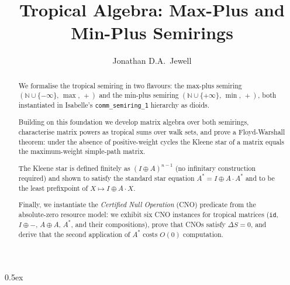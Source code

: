 \documentclass[11pt,a4paper]{article}
\begin{document}
\title{Tropical Algebra: Max-Plus and Min-Plus Semirings}
\author{Jonathan D.A.\ Jewell}
\maketitle

\begin{abstract}
We formalise the tropical semiring in two flavours: the max-plus semiring
$(\mathbb{N} \cup \{-\infty\},\, \max,\, +)$ and the min-plus semiring
$(\mathbb{N} \cup \{+\infty\},\, \min,\, +)$, both instantiated in
Isabelle's \texttt{comm\_semiring\_1} hierarchy as dioids.

Building on this foundation we develop matrix algebra over both semirings,
characterise matrix powers as tropical sums over walk sets, and prove
a Floyd-Warshall theorem: under the absence of positive-weight cycles the
Kleene star of a matrix equals the maximum-weight simple-path matrix.

The Kleene star is defined finitely as $(I \oplus A)^{n-1}$ (no infinitary
construction required) and shown to satisfy the standard star equation
$A^* = I \oplus A \cdot A^*$ and to be the least prefixpoint of
$X \mapsto I \oplus A \cdot X$.

Finally, we instantiate the \emph{Certified Null Operation} (CNO)
predicate from the absolute-zero resource model: we exhibit six CNO
instances for tropical matrices (\texttt{id}, $I \oplus {-}$,
$A \oplus A$, $A^*$, and their compositions), prove that CNOs satisfy
$\Delta S = 0$, and derive that the second application of $A^*$ costs
$O(0)$ computation.
\end{abstract}

\tableofcontents

\parindent 0pt\parskip 0.5ex





\end{document}
